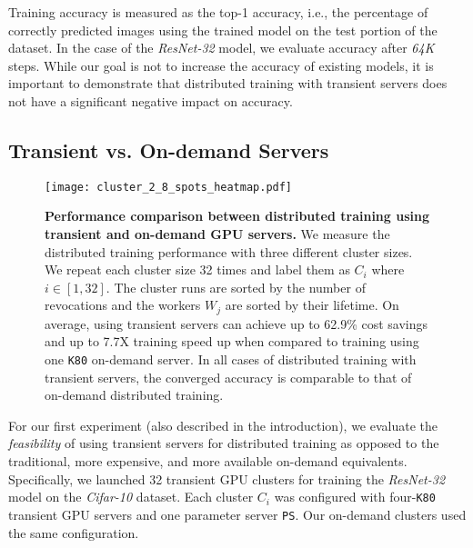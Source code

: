 Training accuracy is measured as the top-1 accuracy, i.e., the percentage of
correctly predicted images using the trained model on the test portion of the
dataset. In the case of the \emph{ResNet-32} model, we evaluate accuracy after
\emph{64K} steps. While our goal is not to increase the accuracy of existing models,
it is important to demonstrate that distributed training with transient servers
does not have a significant negative impact on accuracy. 






\subsection{Transient vs. On-demand Servers}
\label{subsec:trans_v_ondemand}


\begin{figure}[t]
\centering
    \texttt{[image: cluster\_2\_8\_spots\_heatmap.pdf]}
\caption{\textbf{Performance comparison between distributed training using transient and on-demand GPU servers.} 
We measure the distributed training performance with three different cluster sizes. We repeat each cluster size 32 times and label them as $C_i$ where $i \in [1, 32]$. 
The cluster runs are sorted by the number of revocations and the workers $W_j$ are sorted by their lifetime. 
On average, using transient servers can achieve up to 62.9\% cost savings and up to 7.7X training speed up when compared to training using one \texttt{K80} on-demand server. 
In all cases of distributed training with transient servers, the converged accuracy is comparable to that of on-demand distributed training.}
    \label{eval:dist_transient_2_8}
\end{figure}


For our first experiment (also described in the introduction), we evaluate the
\emph{feasibility} of using transient servers for distributed training as opposed to
the traditional, more expensive, and more available on-demand equivalents.
Specifically, we launched 32 transient GPU clusters for training the
\emph{ResNet-32} model on the \emph{Cifar-10} dataset. Each cluster $C_i$ was configured with
four-\texttt{K80} transient GPU servers and one parameter server \texttt{PS}. Our on-demand
clusters used the same configuration. 

